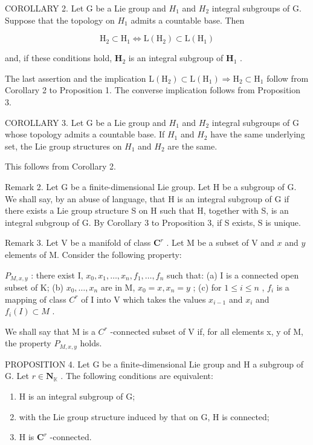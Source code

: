 COROLLARY 2. Let G be a Lie group and \(H_{1}\) and \(H_{2}\) integral subgroups of G. Suppose that the topology on \(H_{1}\) admits a countable base. Then

\[
\mathrm{H} _ {2} \subset \mathrm{H} _ {1} \Leftrightarrow \mathrm{L} (\mathrm{H} _ {2}) \subset \mathrm{L} (\mathrm{H} _ {1})
\]

and, if these conditions hold, \(\mathbf{H}_2\) is an integral subgroup of \(\mathbf{H}_1\) .

The last assertion and the implication \(\mathrm{L}(\mathrm{H}_{2})\subset\mathrm{L}(\mathrm{H}_{1})\Rightarrow\mathrm{H}_{2}\subset\mathrm{H}_{1}\) follow from Corollary 2 to Proposition 1. The converse implication follows from Proposition 3.

COROLLARY 3. Let G be a Lie group and \(H_{1}\) and \(H_{2}\) integral subgroups of G whose topology admits a countable base. If \(H_{1}\) and \(H_{2}\) have the same underlying set, the Lie group structures on \(H_{1}\) and \(H_{2}\) are the same.

This follows from Corollary 2.

Remark 2. Let G be a finite-dimensional Lie group. Let H be a subgroup of G. We shall say, by an abuse of language, that H is an integral subgroup of G if there exists a Lie group structure S on H such that H, together with S, is an integral subgroup of G. By Corollary 3 to Proposition 3, if S exists, S is unique.

Remark 3. Let V be a manifold of class \(\mathbf{C}^r\) . Let M be a subset of V and \(x\) and \(y\) elements of M. Consider the following property:

\(P_{M,x,y}\) : there exist I, \(x_{0}, x_{1}, \ldots, x_{n}, f_{1}, \ldots, f_{n}\) such that: (a) I is a connected open subset of K; (b) \(x_{0}, \ldots, x_{n}\) are in M, \(x_{0} = x, x_{n} = y\) ; (c) for \(1 \leqslant i \leqslant n\) , \(f_{i}\) is a mapping of class \(C^{r}\) of I into V which takes the values \(x_{i-1}\) and \(x_{i}\) and \(f_{i}(I) \subset M\) .

We shall say that M is a \(C^{r}\) -connected subset of V if, for all elements x, y of M, the property \(P_{M,x,y}\) holds.

PROPOSITION 4. Let G be a finite-dimensional Lie group and H a subgroup of G. Let \(r \in \mathbf{N}_{\mathbb{K}}\) . The following conditions are equivalent:

\begin{enumerate}
\def\labelenumi{(\roman{enumi})}
\item
  H is an integral subgroup of G;
\item
  with the Lie group structure induced by that on G, H is connected;
\item
  H is \(\mathbf{C}^r\) -connected.
\end{enumerate}

